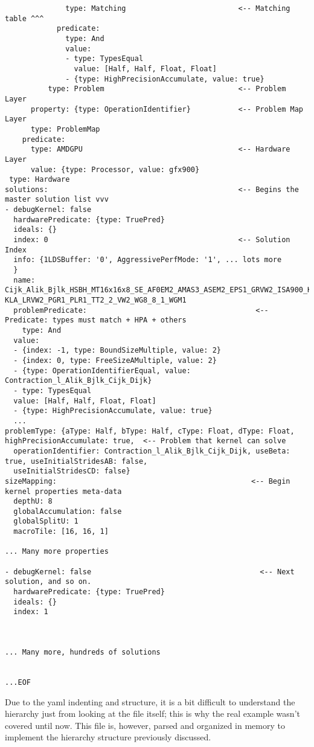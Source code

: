 \documentclass[]{article}
\begin{document}
\begin{verbatim}
              type: Matching                          <-- Matching table ^^^
            predicate:
              type: And
              value:
              - type: TypesEqual
                value: [Half, Half, Float, Float]
              - {type: HighPrecisionAccumulate, value: true}
          type: Problem                               <-- Problem Layer
      property: {type: OperationIdentifier}           <-- Problem Map Layer
      type: ProblemMap
    predicate:
      type: AMDGPU                                    <-- Hardware Layer
      value: {type: Processor, value: gfx900}
 type: Hardware
solutions:                                            <-- Begins the master solution list vvv
- debugKernel: false
  hardwarePredicate: {type: TruePred}
  ideals: {}
  index: 0                                            <-- Solution Index
  info: {1LDSBuffer: '0', AggressivePerfMode: '1', ... lots more
  }
  name: Cijk_Alik_Bjlk_HSBH_MT16x16x8_SE_AF0EM2_AMAS3_ASEM2_EPS1_GRVW2_ISA900_K1_ KLA_LRVW2_PGR1_PLR1_TT2_2_VW2_WG8_8_1_WGM1
  problemPredicate:                                       <-- Predicate: types must match + HPA + others
    type: And
  value:
  - {index: -1, type: BoundSizeMultiple, value: 2}
  - {index: 0, type: FreeSizeAMultiple, value: 2}
  - {type: OperationIdentifierEqual, value: Contraction_l_Alik_Bjlk_Cijk_Dijk}
  - type: TypesEqual
  value: [Half, Half, Float, Float]
  - {type: HighPrecisionAccumulate, value: true}
  ...
problemType: {aType: Half, bType: Half, cType: Float, dType: Float, highPrecisionAccumulate: true,  <-- Problem that kernel can solve
  operationIdentifier: Contraction_l_Alik_Bjlk_Cijk_Dijk, useBeta: true, useInitialStridesAB: false,
  useInitialStridesCD: false}
sizeMapping:                                             <-- Begin kernel properties meta-data
  depthU: 8
  globalAccumulation: false
  globalSplitU: 1
  macroTile: [16, 16, 1]

... Many more properties

- debugKernel: false                                       <-- Next solution, and so on.
  hardwarePredicate: {type: TruePred}
  ideals: {}
  index: 1



... Many more, hundreds of solutions


...EOF
\end{verbatim}

\noindent
Due to the yaml indenting and structure, it is a bit difficult to understand the hierarchy just from looking at the file itself; this is why the real example wasn't covered until now. This file is, however, parsed and organized in memory to implement the hierarchy structure previously discussed.
\end{document}
